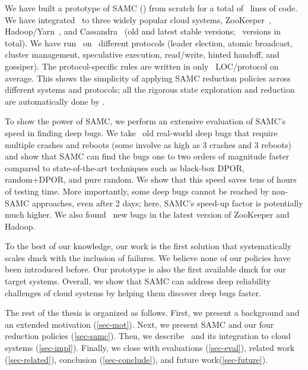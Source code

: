 We have built a prototype of SAMC (\sampro) from scratch for a total
of \numLinesSamPro\ lines of code.  We have integrated \sampro\ to
three widely popular cloud systems,
ZooKeeper~\cite{Hunt+10-ZooKeeperPaper},
Hadoop/Yarn~\cite{Kumar+13-Yarn}, and
Cassandra~\cite{Lakshman+09-Cassandra} (old and latest stable
versions; \numVersions\ versions in total).  We have run \sampro\
on \numProtocols\ different protocols (leader election, atomic
broadcast, cluster management, speculative execution, read/write,
hinted handoff, and gossiper).  The protocol-specific rules are
written in only \numLinesRule\ LOC/protocol on average.  This shows
the simplicity of applying SAMC reduction policies across different
systems and protocols; all the rigorous state exploration and
reduction are automatically done by \sampro.

To show the power of SAMC, we perform an extensive evaluation of
SAMC's speed in finding deep bugs.  We take \numOldDeepBugs\ old
real-world deep bugs that require multiple crashes and reboots (some
involve as high as 3 crashes and 3 reboots) and show that SAMC can
find the bugs 
one to two orders of magnitude faster compared to state-of-the-art
techniques such as black-box DPOR, random+DPOR, and pure random.  We
show that this speed saves tens of hours of testing time.  More
importantly, some deep bugs cannot be reached by non-SAMC approaches,
even after 2 days; here, SAMC's speed-up factor is potentially much
higher.  We also found \numNewBugs\ new bugs in the latest version of
ZooKeeper and Hadoop.


To the best of our knowledge, our work is the first solution that
systematically scales dmck with the inclusion of failures.  We believe
none of our policies have been introduced before.  Our prototype is
also the first available dmck for our target systems.  Overall, we
show that SAMC can address deep reliability challenges of cloud
systems by helping them discover deep bugs faster.

The rest of the thesis is organized as follows.  First, we present a
background and an extended motivation (\sec\ref{sec-mot}).  Next, we
present SAMC and our four reduction policies (\sec\ref{sec-samc}).
Then, we describe \sampro\ and its integration to cloud systems
(\sec\ref{sec-impl}).  Finally, we close with evaluations
(\sec\ref{sec-eval}), related work (\sec\ref{sec-related}),
conclusion (\sec\ref{sec-conclude}), and future 
work(\sec\ref{sec-future}).

